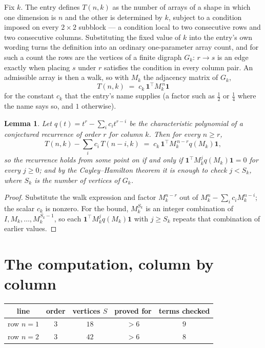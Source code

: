 \documentclass[11pt,a4paper]{article}
\theoremstyle{plain}
\newtheorem{lemma}[theorem]{Lemma}
\theoremstyle{definition}
\begin{document}
Fix $k$. The entry defines $T(n,k)$ as the number of arrays of a shape in which one dimension
is $n$ and the other is determined by $k$, subject to a condition imposed on every
$2\times2$ subblock --- a condition local to two consecutive rows and two consecutive columns.
Substituting the fixed value of $k$ into the entry's own wording turns the definition into an
ordinary one-parameter array count, and for such a count the rows are the vertices of a finite
digraph $G_k$: $r\to s$ is an edge exactly when placing $s$ under $r$ satisfies the condition
in every column pair. An admissible array is then a walk, so with $M_k$ the adjacency matrix
of $G_k$,
\[
T(n,k)\;=\;c_k\,\mathbf{1}^{\!\top}M_k^{\,n}\mathbf{1}
\]
for the constant $c_k$ that the entry's name supplies (a factor such as $\tfrac12$ or
$\tfrac14$ where the name says so, and $1$ otherwise).

\begin{lemma}\label{lem:crit}
Let $q(t)=t^{r}-\sum_i c_it^{r-i}$ be the characteristic polynomial of a conjectured
recurrence of order $r$ for column $k$. Then for every $n\ge r$,
\[
T(n,k)-\sum_i c_i\,T(n-i,k)\;=\;c_k\,\mathbf{1}^{\!\top}M_k^{\,n-r}q(M_k)\mathbf{1},
\]
so the recurrence holds from some point on if and only if
$\mathbf{1}^{\!\top}M_k^{j}q(M_k)\mathbf{1}=0$ for every $j\ge0$; and by the
Cayley--Hamilton theorem it is enough to check $j<S_k$, where $S_k$ is the number of vertices
of $G_k$.
\end{lemma}

\begin{proof}
Substitute the walk expression and factor $M_k^{n-r}$ out of $M_k^{n}-\sum_ic_iM_k^{n-i}$;
the scalar $c_k$ is nonzero. For the bound, $M_k^{S_k}$ is an integer combination of
$I,M_k,\dots,M_k^{S_k-1}$, so each $\mathbf{1}^{\!\top}M_k^{j}q(M_k)\mathbf{1}$ with
$j\ge S_k$ repeats that combination of earlier values.
\end{proof}

\section{The computation, column by column}

\begin{center}
\begin{tabular}{ccccc}
line & order & vertices $S$ & proved for & terms checked \\ \hline
row $n$$=1$ & $3$ & $18$ & $>6$ & $9$ \\
row $n$$=2$ & $3$ & $42$ & $>6$ & $8$ \\
\end{tabular}
\end{center}
\end{document}
